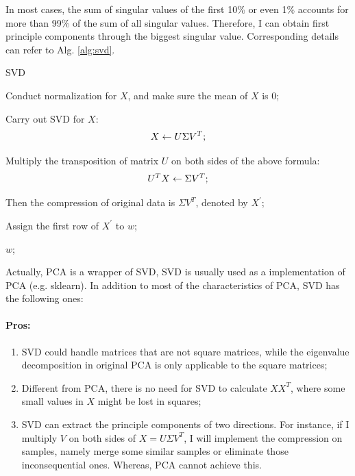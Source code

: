 \documentclass[12pt,a4paper]{article}
\theoremstyle{definition}
\begin{document}
In most cases, the sum of singular values of the first 10\% or even 1\% accounts for more than 99\% of the sum of all singular values. Therefore, I can obtain first principle components through the biggest singular value. Corresponding details can refer to Alg. \ref{alg:svd}.

\vspace{0.01\linewidth}
\begin{algorithm}[H]
	\caption{SVD}
	\label{alg:svd}
	\vspace{0.25\baselineskip}
	
	
	Conduct normalization for $X$, and make sure the mean of $X$ is 0;
	
	Carry out SVD for $X$:
	\begin{equation*}
		\centering
		X \leftarrow U \Sigma V^T;
	\end{equation*}
	
	Multiply the transposition of matrix $U$ on both sides of the above formula:
	\begin{equation*}
		\centering
		U^TX \leftarrow \Sigma V^T;
	\end{equation*}
	
	Then the compression of original data is $\Sigma V^T$, denoted by $X^{'}$;
	
	Assign the first row of $X^{'}$ to $w$;
	
	\Return $w$;
\end{algorithm}
\vspace{0.01\linewidth}

Actually, PCA is a wrapper of SVD, SVD is usually used as a implementation of PCA (e.g. sklearn). In addition to most of the characteristics of PCA, SVD has the following ones:

\vspace{-0.012\linewidth}
\paragraph{Pros:}
\begin{enumerate}
	\item SVD could handle matrices that are not square matrices, while the eigenvalue decomposition in original PCA is only applicable to the square matrices;
	
	\item Different from PCA, there is no need for SVD to calculate $XX^T$, where some small values in $X$ might be lost in squares;
	
	\item SVD can extract the principle components of two directions. For instance, if I multiply $V$ on both sides of $X=U \Sigma V^T$, I will implement the compression on samples, namely merge some similar samples or eliminate those inconsequential ones. Whereas, PCA cannot achieve this.
\end{enumerate}
\end{document}
